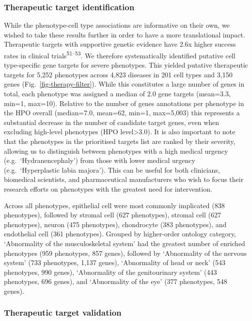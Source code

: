 \documentclass[
]{article}
\begin{document}
\subsubsection{Therapeutic target
identification}\label{therapeutic-target-identification}

While the phenotype-cell type associations are informative on their own,
we wished to take these results further in order to have a more
translational impact. Therapeutic targets with supportive genetic
evidence have 2.6x higher success rates in clinical
trials\textsuperscript{51--53}. We therefore systematically identified
putative cell type-specific gene targets for severe phenotypes. This
yielded putative therapeutic targets for 5,252 phenotypes across 4,823
diseases in 201 cell types and 3,150 genes
(Fig.~\ref{fig-therapy-filter}). While this constitutes a large number
of genes in total, each phenotype was assigned a median of \(2.0\) gene
targets (mean=\(3.3\), min=1, max=10). Relative to the number of genes
annotations per phenotype in the HPO overall (median=\(7.0\),
mean=\(62\), min=1, max=5,003) this represents a substantial decrease in
the number of candidate target genes, even when excluding high-level
phenotypes (HPO level\textgreater{}\(3.0\)). It is also important to
note that the phenotypes in the prioritised targets list are ranked by
their severity, allowing us to distinguish between phenotypes with a
high medical urgency (e.g.~`Hydranencephaly') from those with lower
medical urgency (e.g.~`Hyperplastic labia majora'). This can be useful
for both clinicians, biomedical scientists, and pharmaceutical
manufacturers who wish to focus their research efforts on phenotypes
with the greatest need for intervention.

Across all phenotypes, epithelial cell were most commonly implicated
(838 phenotypes), followed by stromal cell (627 phenotypes), stromal
cell (627 phenotypes), neuron (475 phenotypes), chondrocyte (383
phenotypes), and endothelial cell (361 phenotypes). Grouped by
higher-order ontology category, `Abnormality of the musculoskeletal
system' had the greatest number of enriched phenotypes (959 phenotypes,
857 genes), followed by `Abnormality of the nervous system' (733
phenotypes, 1,137 genes), `Abnormality of head or neck' (543 phenotypes,
990 genes), `Abnormality of the genitourinary system' (443 phenotypes,
696 genes), and `Abnormality of the eye' (377 phenotypes, 548 genes).

\subsubsection{Therapeutic target
validation}\label{therapeutic-target-validation}
\end{document}
